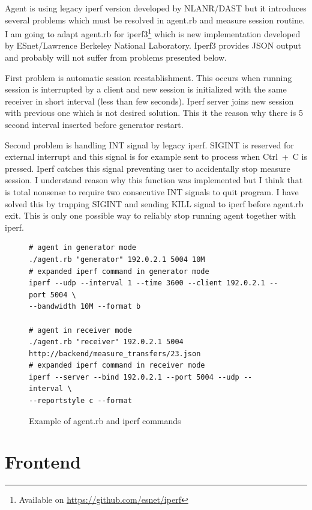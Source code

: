 Agent is using legacy iperf version developed by NLANR/DAST but it introduces several problems which must be resolved in agent.rb and measure session routine. I am going to adapt agent.rb for iperf3\footnote{Available on \url{https://github.com/esnet/iperf}} which is new implementation developed by ESnet/Lawrence Berkeley National Laboratory. Iperf3 provides \Ac{JSON} output and probably will not suffer from problems presented below.

First problem is automatic session reestablishment. This occurs when running session is interrupted by a client and new session is initialized with the same receiver in short interval (less than few seconds). Iperf server joins new session with previous one which is not desired solution. This it the reason why there is 5 second interval inserted before generator restart. 

Second problem is handling INT signal by legacy iperf. SIGINT is reserved for external interrupt and this signal is for example sent to process when \mbox{Ctrl + C} is pressed. Iperf catches this signal preventing user to accidentally stop measure session. I understand reason why this function was implemented but I think that is total nonsense to require two consecutive INT signals to quit program. I have solved this by trapping SIGINT and sending KILL signal to iperf before agent.rb exit. This is only one possible way to reliably stop running agent together with iperf.

\begin{figure}[htb]
\caption{Example of agent.rb and iperf commands}
\label{code:fw}
\begin{verbatim}
# agent in generator mode
./agent.rb "generator" 192.0.2.1 5004 10M
# expanded iperf command in generator mode
iperf --udp --interval 1 --time 3600 --client 192.0.2.1 --port 5004 \
--bandwidth 10M --format b
	
# agent in receiver mode
./agent.rb "receiver" 192.0.2.1 5004 http://backend/measure_transfers/23.json
# expanded iperf command in receiver mode
iperf --server --bind 192.0.2.1 --port 5004 --udp --interval \
--reportstyle c --format
\end{verbatim}
\end{figure}


\section{Frontend}


